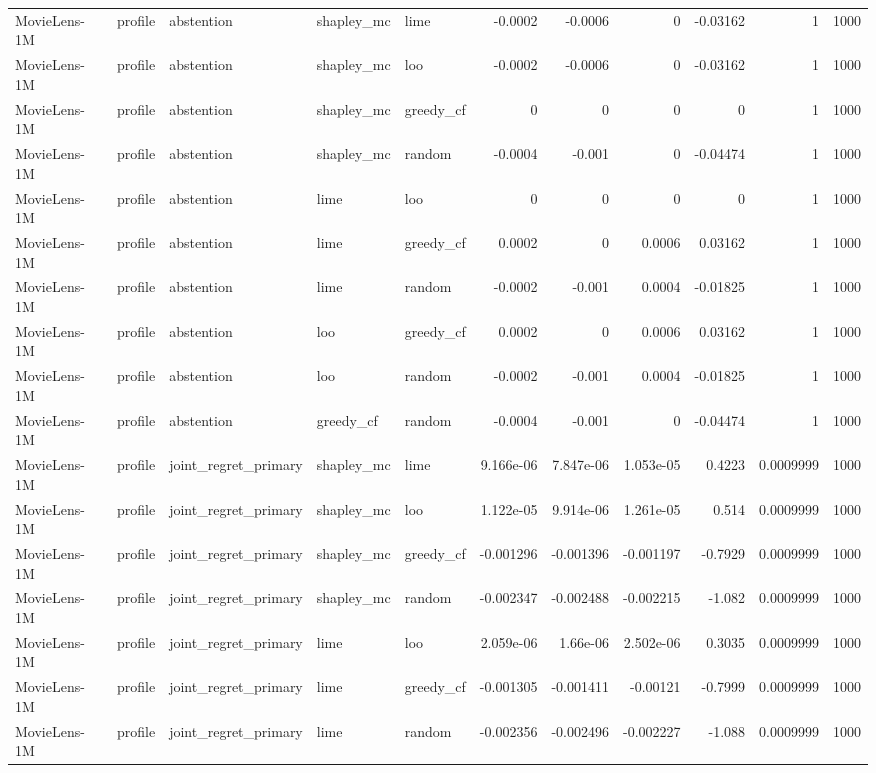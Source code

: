 \begin{table}[t]
\begin{tabular}{lllllrrrrrr}
MovieLens-1M & profile & abstention & shapley\_mc & lime & -0.0002 & -0.0006 & 0 & -0.03162 & 1 & 1000 \\
MovieLens-1M & profile & abstention & shapley\_mc & loo & -0.0002 & -0.0006 & 0 & -0.03162 & 1 & 1000 \\
MovieLens-1M & profile & abstention & shapley\_mc & greedy\_cf & 0 & 0 & 0 & 0 & 1 & 1000 \\
MovieLens-1M & profile & abstention & shapley\_mc & random & -0.0004 & -0.001 & 0 & -0.04474 & 1 & 1000 \\
MovieLens-1M & profile & abstention & lime & loo & 0 & 0 & 0 & 0 & 1 & 1000 \\
MovieLens-1M & profile & abstention & lime & greedy\_cf & 0.0002 & 0 & 0.0006 & 0.03162 & 1 & 1000 \\
MovieLens-1M & profile & abstention & lime & random & -0.0002 & -0.001 & 0.0004 & -0.01825 & 1 & 1000 \\
MovieLens-1M & profile & abstention & loo & greedy\_cf & 0.0002 & 0 & 0.0006 & 0.03162 & 1 & 1000 \\
MovieLens-1M & profile & abstention & loo & random & -0.0002 & -0.001 & 0.0004 & -0.01825 & 1 & 1000 \\
MovieLens-1M & profile & abstention & greedy\_cf & random & -0.0004 & -0.001 & 0 & -0.04474 & 1 & 1000 \\
MovieLens-1M & profile & joint\_regret\_primary & shapley\_mc & lime & 9.166e-06 & 7.847e-06 & 1.053e-05 & 0.4223 & 0.0009999 & 1000 \\
MovieLens-1M & profile & joint\_regret\_primary & shapley\_mc & loo & 1.122e-05 & 9.914e-06 & 1.261e-05 & 0.514 & 0.0009999 & 1000 \\
MovieLens-1M & profile & joint\_regret\_primary & shapley\_mc & greedy\_cf & -0.001296 & -0.001396 & -0.001197 & -0.7929 & 0.0009999 & 1000 \\
MovieLens-1M & profile & joint\_regret\_primary & shapley\_mc & random & -0.002347 & -0.002488 & -0.002215 & -1.082 & 0.0009999 & 1000 \\
MovieLens-1M & profile & joint\_regret\_primary & lime & loo & 2.059e-06 & 1.66e-06 & 2.502e-06 & 0.3035 & 0.0009999 & 1000 \\
MovieLens-1M & profile & joint\_regret\_primary & lime & greedy\_cf & -0.001305 & -0.001411 & -0.00121 & -0.7999 & 0.0009999 & 1000 \\
MovieLens-1M & profile & joint\_regret\_primary & lime & random & -0.002356 & -0.002496 & -0.002227 & -1.088 & 0.0009999 & 1000 \\

\end{tabular}
\end{table}
